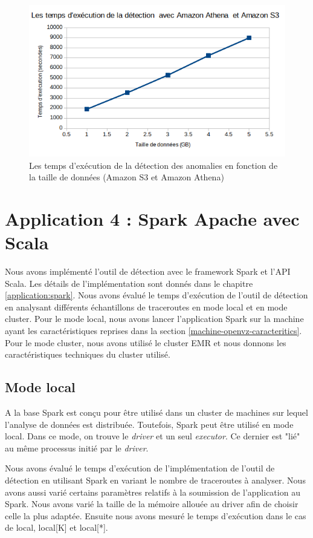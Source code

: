 \begin{figure}[H]
	\centering
	\captionsetup{justification=centering}
	\includegraphics[width=0.7\linewidth]{illustrations/temps-avec-aws_1}
	\caption{Les temps d'exécution de la détection des anomalies en fonction de la taille de données (Amazon S3 et Amazon Athena)}
	\label{fig:temps-avec-aws}
\end{figure}


\section{Application 4 : Spark Apache avec Scala}
Nous avons implémenté l'outil de détection avec le framework Spark et l'API Scala. Les détails de l'implémentation sont donnés dans le chapitre \ref{application:spark}.  Nous avons évalué le temps d'exécution de l'outil de détection en analysant différents échantillons de traceroutes  en mode local et en mode cluster. Pour le mode local, nous avons lancer l'application Spark sur la machine ayant les caractéristiques  reprises dans la section \ref{machine-openvz-caracteritics}. Pour le mode cluster, nous avons utilisé le cluster EMR et nous donnons les caractéristiques techniques du cluster utilisé.


\subsection{Mode local}

A la base Spark est conçu pour être utilisé dans un cluster de machines sur  lequel l'analyse de données est distribuée. Toutefois, Spark peut être utilisé en mode local. Dans ce mode, on trouve le \textit{driver} et un seul \textit{executor}. Ce dernier est "lié" au même processus initié par le \textit{driver}. 


Nous avons évalué le temps d'exécution de l'implémentation de l'outil de détection en utilisant Spark en variant le nombre de traceroutes à analyser. Nous avons aussi varié certains paramètres relatifs à la soumission de l'application au Spark. Nous avons varié la taille de la mémoire allouée au driver afin de choisir celle la plus adaptée. Ensuite nous avons mesuré le temps d'exécution dans le cas de local, local[K] et local[*].

